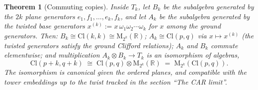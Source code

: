 \documentclass[11pt]{article}
\newtheorem{theorem}{Theorem}[section]
\theoremstyle{definition}
\theoremstyle{plain}
\providecommand{\Cl}{}\renewcommand{\Cl}{\mathrm{Cl}}
\providecommand{\Mat}{}\renewcommand{\Mat}{\mathrm{M}}
\providecommand{\R}{}\renewcommand{\R}{\mathbb{R}}
\begin{document}
\begin{theorem}[Commuting copies]\label{c:tower.commuting-copies}
Inside $T_k$, let $B_k$ be the subalgebra generated by the $2k$ plane generators $e_1, f_1, \dots, e_k, f_k$, and let $A_k$ be the subalgebra generated by the twisted base generators $x^{(k)} := x\,\omega_1 \omega_2 \cdots \omega_k$ for $x$ among the ground generators. Then: $B_k \cong \Cl(k,k) \cong \Mat_{2^k}(\R)$; $A_k \cong \Cl(p,q)$ via $x \mapsto x^{(k)}$ (the twisted generators satisfy the ground Clifford relations); $A_k$ and $B_k$ commute elementwise; and multiplication $A_k \otimes B_k \to T_k$ is an isomorphism of algebras,
\[
\Cl(p{+}k, q{+}k) \;\cong\; \Cl(p,q) \otimes \Mat_{2^k}(\R) \;=\; \Mat_{2^k}(\Cl(p,q)).
\]
The isomorphism is canonical given the ordered planes, and compatible with the tower embeddings up to the twist tracked in the section ``The CAR limit''.
\end{theorem}
\end{document}
